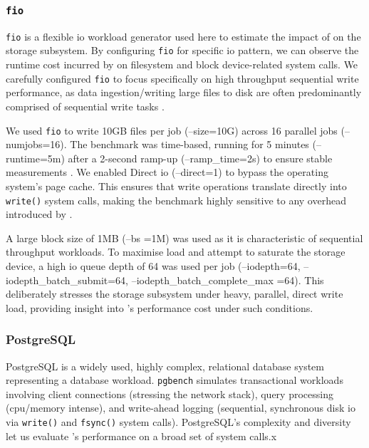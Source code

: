 \subsubsection{\texttt{fio}}\label{subsubsec:fio-just}
\texttt{fio}  is a flexible \ac{io} workload generator used here to estimate
the impact of \af on the storage subsystem. By configuring \texttt{fio} for
specific \ac{io} pattern, we can observe the runtime cost incurred by \af on
filesystem and block device-related system calls. We carefully configured
\texttt{fio} to focus specifically on high throughput sequential write
performance, as data ingestion/writing large files to disk are often 
predominantly comprised of sequential write tasks \cite{WRITES_ARE_SEQUENTIAL}.

We used \texttt{fio} to write 10GB files per job (--size=10G) across 16
parallel jobs  (--numjobs=16).  The benchmark was time-based, running for 5
minutes (--runtime=5m) after a 2-second ramp-up (--ramp\_time=2s) to ensure
stable measurements \cite{fio-docs}. We enabled Direct \ac{io} (--direct=1) to
bypass the operating system's page cache. This ensures that write operations
translate directly into \texttt{write()} system calls, making the benchmark
highly sensitive to any overhead introduced by \af. 

A large block size of 1MB (--bs =1M) was used as it is characteristic of
sequential throughput workloads. To maximise load and attempt to saturate
the storage device, a high \ac{io} queue depth of 64 was used per
job  (--iodepth=64, --iodepth\_batch\_submit=64, --iodepth\_batch\_complete\_max
=64). This deliberately stresses the storage subsystem under heavy, parallel,
direct write load, providing insight into \af's performance cost under
such conditions. 

\subsubsection{PostgreSQL}\label{subsubsec:psql-just}

PostgreSQL is a widely used, highly complex, relational database system representing a database workload. \texttt{pgbench} simulates
transactional workloads involving client connections (stressing the network
stack), query processing (\ac{cpu}/memory intense), and write-ahead logging
(sequential, synchronous disk \ac{io} via \texttt{write()} and \texttt{fsync()}
system calls). PostgreSQL's complexity and diversity let us evaluate \af's
performance on a broad set of system calls.x

